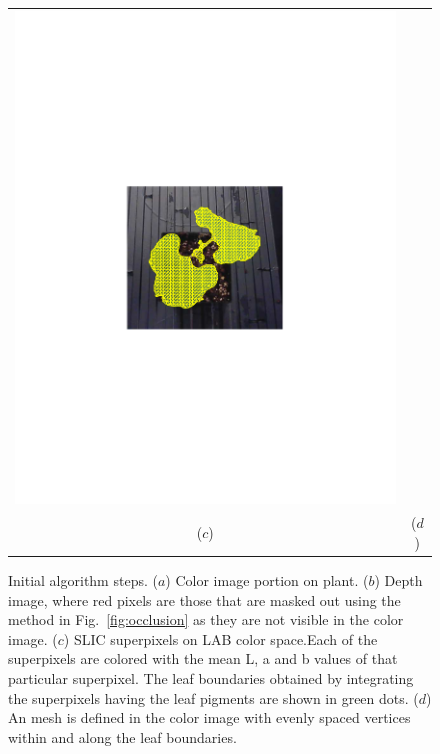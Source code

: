 \begin{figure}
\begin{center}
\begin{tabular}{cc}
\includegraphics[trim=190 280 190 290,clip,width=0.48\linewidth]{Figures/beanColorMesh} \\
($c$) & ($d$) \\
\end{tabular}
\end{center}
\caption{Initial algorithm steps.  ($a$) Color image portion on plant.  ($b$) Depth image, where red pixels are those that are masked out using the method in Fig.~\ref{fig:occlusion} as they are not visible in the color image. ($c$) SLIC superpixels on LAB color space.Each of the superpixels are colored with the mean L, a and b values of that particular superpixel. The leaf boundaries obtained by integrating the superpixels having the leaf pigments are shown in green dots. ($d$) An mesh is defined in the color image with evenly spaced vertices within and along the leaf boundaries. }
\label{fig:beanimageprocess}
\end{figure}

